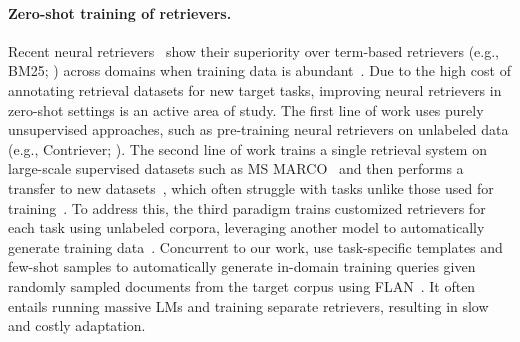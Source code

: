 \label{sec:related_work}
\paragraph{Zero-shot training of retrievers.}
Recent neural retrievers~\cite{karpukhin-etal-2020-dense,lee-etal-2019-latent,colbert} show their superiority over term-based retrievers (e.g., BM25; \citealt{robertson2009probabilistic}) across domains when training data is abundant~\cite{luo2022improving,asai2021one,petroni-etal-2021-kilt}.
{Due to the high cost of annotating retrieval datasets for new target tasks, improving neural retrievers in zero-shot settings is an active area of study. 
The first line of work uses purely unsupervised approaches, such as pre-training neural retrievers on {unlabeled} data (e.g., Contriever; \citealt{izacard2022unsupervised}).
}
The second line of work trains a single retrieval system on large-scale supervised datasets such as MS MARCO~\cite{msmarco} and then performs a transfer to new datasets~\cite{izacard2022unsupervised,colbert,nogueira-etal-2020-document,chen2021salient}, which often struggle with tasks unlike those used for training~\cite{promptagator}. 
To address this, the third paradigm trains customized retrievers for each task using unlabeled corpora, leveraging another model to automatically generate training data~\cite{wang-etal-2022-gpl}. 
Concurrent to our work, \citet{promptagator} use task-specific templates and few-shot samples to automatically generate in-domain training queries given randomly sampled documents from the target corpus using FLAN~\cite{wei2022finetuned}. 
It often entails running massive LMs and training separate retrievers, resulting in slow and costly adaptation. 
